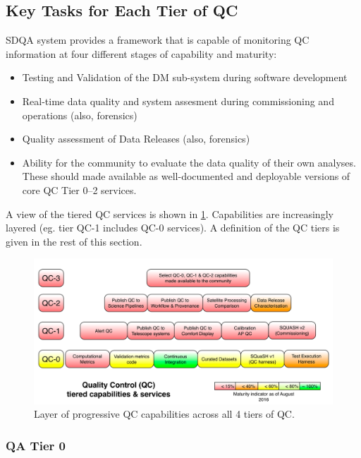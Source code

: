\subsection{Key Tasks for Each Tier of QC}

SDQA system provides a framework that is capable of monitoring QC information at four different stages of capability and maturity:

\begin{itemize}
\item[QA Tier 0] Testing and Validation of the DM sub-system during software development
\item[QA Tier 1] Real-time data quality and system assesment during commissioning and operations (also, forensics)
\item[QA Tier 2] Quality assessment of Data Releases (also, forensics)
\item[QA Tier 3] Ability for the community to evaluate the data quality of their own analyses. These should made available as well-documented and deployable versions of core QC Tier 0--2 services.
\end{itemize}

A view of the tiered QC services is shown in \ref{fig:qa-overview}. Capabilities are increasingly layered (eg. tier QC-1 includes QC-0 services). A definition of the QC tiers is given in the rest of this section.

\begin{figure}
\centering
\includegraphics[width=\textwidth]{figures/qa_services.png}
\caption{Layer of progressive QC capabilities across all 4 tiers of QC.
\label{fig:qa-overview}}
\end{figure}



\subsubsection{QA Tier 0}

